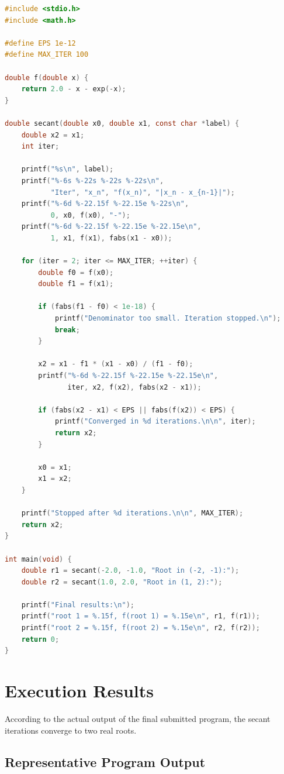\documentclass[12pt,a4paper]{article}
\begin{document}
\begin{lstlisting}[language=C]
#include <stdio.h>
#include <math.h>

#define EPS 1e-12
#define MAX_ITER 100

double f(double x) {
    return 2.0 - x - exp(-x);
}

double secant(double x0, double x1, const char *label) {
    double x2 = x1;
    int iter;

    printf("%s\n", label);
    printf("%-6s %-22s %-22s %-22s\n",
           "Iter", "x_n", "f(x_n)", "|x_n - x_{n-1}|");
    printf("%-6d %-22.15f %-22.15e %-22s\n",
           0, x0, f(x0), "-");
    printf("%-6d %-22.15f %-22.15e %-22.15e\n",
           1, x1, f(x1), fabs(x1 - x0));

    for (iter = 2; iter <= MAX_ITER; ++iter) {
        double f0 = f(x0);
        double f1 = f(x1);

        if (fabs(f1 - f0) < 1e-18) {
            printf("Denominator too small. Iteration stopped.\n");
            break;
        }

        x2 = x1 - f1 * (x1 - x0) / (f1 - f0);
        printf("%-6d %-22.15f %-22.15e %-22.15e\n",
               iter, x2, f(x2), fabs(x2 - x1));

        if (fabs(x2 - x1) < EPS || fabs(f(x2)) < EPS) {
            printf("Converged in %d iterations.\n\n", iter);
            return x2;
        }

        x0 = x1;
        x1 = x2;
    }

    printf("Stopped after %d iterations.\n\n", MAX_ITER);
    return x2;
}

int main(void) {
    double r1 = secant(-2.0, -1.0, "Root in (-2, -1):");
    double r2 = secant(1.0, 2.0, "Root in (1, 2):");

    printf("Final results:\n");
    printf("root 1 = %.15f, f(root 1) = %.15e\n", r1, f(r1));
    printf("root 2 = %.15f, f(root 2) = %.15e\n", r2, f(r2));
    return 0;
}
\end{lstlisting}

\section{Execution Results}

According to the actual output of the final submitted program, the secant iterations converge to two real roots.

\subsection*{Representative Program Output}
\end{document}
